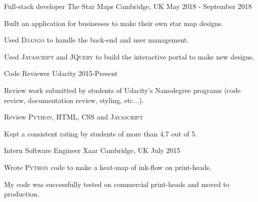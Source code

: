 \begin{cventries}
  \cventry
    {Full-stack developer} %
    {The Star Maps} %
    {Cambridge, UK} %
    {May 2018 - September 2018} %
    {
      \begin{cvitems} %
        \item Built an application for businesses to make their own star map designs.
        \item Used \textsc{Django} to handle the back-end and user management.
        \item Used \textsc{Javascript} and \textsc{JQuery} to build the interactive portal to make new designs.
      \end{cvitems}
    }
  \cventry
    {Code Reviewer} %
    {Udacity} %
    {} %
    { 2015-Present} %
    {
      \begin{cvitems} %
        \item {Review work submitted by students of Udacity's Nanodegree programs (code review, documentation review, styling, etc...).} 
        \item {Review \textsc{Python}, \textsc{HTML}, \textsc{CSS} and \textsc{Javascript}}
        \item {Kept a consistent rating by students of more than 4.7 out of 5.}
      \end{cvitems}
    }
  \cventry
    {Intern Software Engineer} %
    {Xaar} %
    {Cambridge, UK} %
    {July 2015} %
    {
      \begin{cvitems} %
        \item{Wrote \textsc{Python} code to make a heat-map of ink-flow on print-heads.}
        \item {My code was successfully tested on commercial print-heads and moved to production.}
      \end{cvitems}
    }

\end{cventries}
